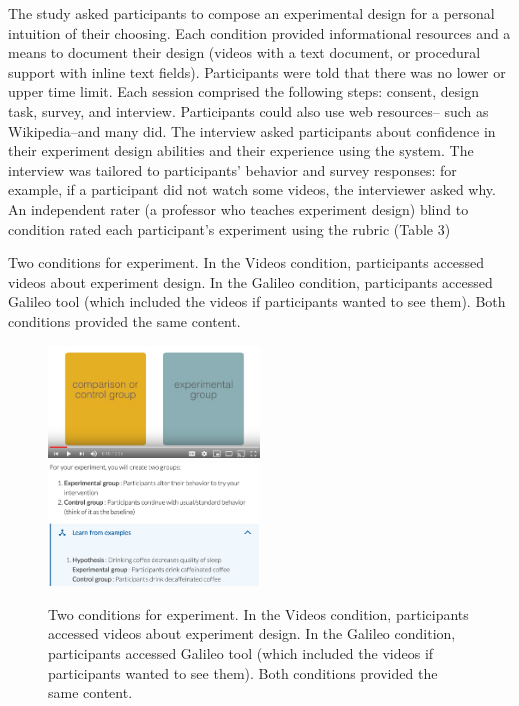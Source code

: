 The study asked participants to compose an experimental design for a personal intuition of their choosing. Each condition provided informational resources and a means to document their design (videos with a text document, or procedural support with inline text fields). Participants were told that there was no lower or upper time limit. Each session comprised the following steps: consent, design task, survey, and interview. Participants could also use web resources-- such as Wikipedia--and many did. The interview asked participants about confidence in their experiment design abilities and their experience using the system. The interview was tailored to participants’ behavior and survey responses: for example, if a participant did not watch some videos, the interviewer asked why. An independent rater (a professor who teaches experiment design) blind to condition rated each participant’s experiment using the rubric (Table 3)

Two conditions for experiment. In the Videos condition, participants accessed videos about experiment design. In the Galileo condition, participants accessed Galileo tool (which included the videos if participants wanted to see them). Both conditions provided the same content.

\begin{figure}[t] 
  \includegraphics[width=0.5\textwidth]{figures/galileo/galileo-study-1}
  \includegraphics[width=0.5\textwidth]{figures/galileo/galileo-study-2}
  \caption[Two conditions for experiment: Videos and Galileo]
{Two conditions for experiment. In the Videos condition, participants accessed videos about experiment design. In the Galileo condition, participants accessed Galileo tool (which included the videos if participants wanted to see them). Both conditions provided the same content. }
  \label{fig:galileo-study}
\end{figure}

